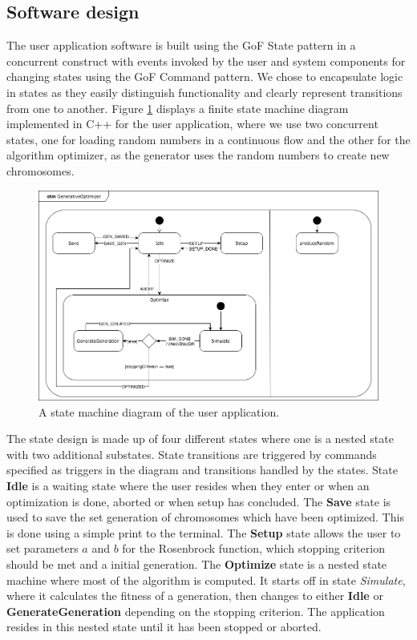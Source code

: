 \subsection{Software design}

The user application software is built using the GoF State pattern in a concurrent construct with events invoked by the user and system components for changing states using the GoF Command pattern. We chose to encapsulate logic in states as they easily distinguish functionality and clearly represent transitions from one to another. Figure \ref{fig:statemachine} displays a finite state machine diagram implemented in C++ for the user application, where we use two concurrent states, one for loading random numbers in a continuous flow and the other for the algorithm optimizer, as the generator uses the random numbers to create new chromosomes.

\begin{figure}[h!]
	\centering
	\includegraphics[width=0.9\linewidth]{../diagrams/statemachine.png}
	\caption{A state machine diagram of the user application.}
	\label{fig:statemachine}
\end{figure}

The state design is made up of four different states where one is a nested state with two additional substates.
State transitions are triggered by commands specified as triggers in the diagram and transitions handled by the states. State \textbf{Idle} is a waiting state where the user resides when they enter or when an optimization is done, aborted or when setup has concluded. The \textbf{Save} state is used to save the set generation of chromosomes which have been optimized. This is done using a simple print to the terminal. The \textbf{Setup} state allows the user to set parameters $a$ and $b$ for the Rosenbrock function, which stopping criterion should be met and a initial generation. The \textbf{Optimize} state is a nested state machine where most of the algorithm is computed. It starts off in state \emph{Simulate}, where it calculates the fitness of a generation, then changes to either \textbf{Idle} or \textbf{GenerateGeneration} depending on the stopping criterion. The application resides in this nested state until it has been stopped or aborted.

